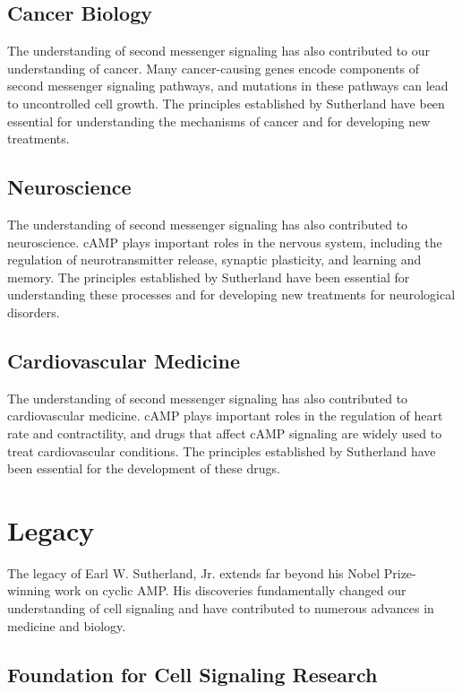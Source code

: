 \subsection{Cancer Biology}

The understanding of second messenger signaling has also contributed to our understanding of cancer. Many cancer-causing genes encode components of second messenger signaling pathways, and mutations in these pathways can lead to uncontrolled cell growth. The principles established by Sutherland have been essential for understanding the mechanisms of cancer and for developing new treatments.

\subsection{Neuroscience}

The understanding of second messenger signaling has also contributed to neuroscience. cAMP plays important roles in the nervous system, including the regulation of neurotransmitter release, synaptic plasticity, and learning and memory. The principles established by Sutherland have been essential for understanding these processes and for developing new treatments for neurological disorders.

\subsection{Cardiovascular Medicine}

The understanding of second messenger signaling has also contributed to cardiovascular medicine. cAMP plays important roles in the regulation of heart rate and contractility, and drugs that affect cAMP signaling are widely used to treat cardiovascular conditions. The principles established by Sutherland have been essential for the development of these drugs.

\section{Legacy}

The legacy of Earl W. Sutherland, Jr. extends far beyond his Nobel Prize-winning work on cyclic AMP. His discoveries fundamentally changed our understanding of cell signaling and have contributed to numerous advances in medicine and biology.

\subsection{Foundation for Cell Signaling Research}

